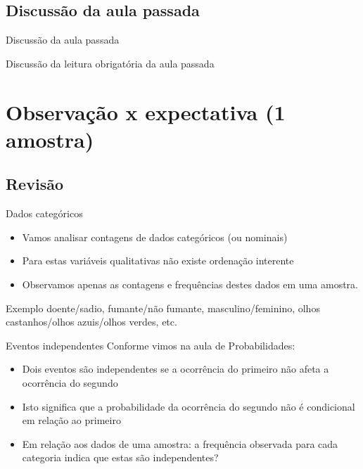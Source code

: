 \documentclass{beamer}
\begin{document}
\subsection{Discussão da aula passada}

\begin{frame}{Discussão da aula passada}
  \begin{block}{}
    Discussão da leitura obrigatória da aula passada
  \end{block}
\end{frame}

\section[1 amostra]{Observação x expectativa (1 amostra)}

\subsection{Revisão}

\begin{frame}{Dados categóricos}
  \begin{itemize}
  \item Vamos analisar contagens de dados categóricos (ou nominais)
  \item Para estas variáveis qualitativas não existe ordenação interente
  \item Observamos apenas as contagens e frequências destes dados em
    uma amostra.
  \end{itemize}
  \begin{exampleblock}{Exemplo}
    doente/sadio, fumante/não fumante, masculino/feminino, olhos
    castanhos/olhos azuis/olhos verdes, etc.
  \end{exampleblock}
\end{frame}

\begin{frame}{Eventos independentes}
  Conforme vimos na aula de Probabilidades:
  \begin{itemize}
  \item Dois eventos são independentes se a ocorrência do primeiro não
    afeta a ocorrência do segundo
  \item Isto significa que a probabilidade da ocorrência do segundo
    não é condicional em relação ao primeiro
  \item Em relação aos dados de uma amostra: a frequência observada
    para cada categoria indica que estas são independentes?
  \end{itemize}
\end{frame}
\end{document}
